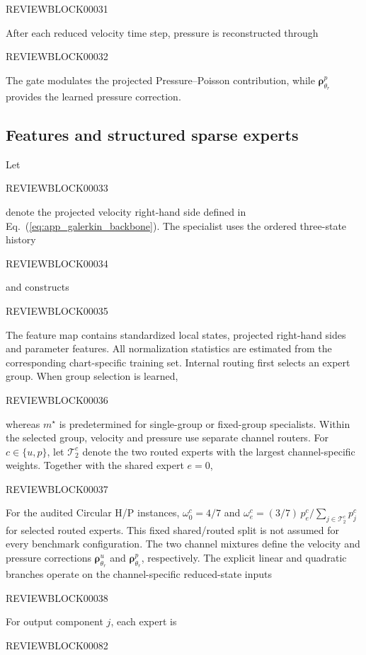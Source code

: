 \documentclass{article}
\def\plaineqref#1{\ref{#1}}
\begin{document}
REVIEWBLOCK00031


After each reduced velocity time step, pressure is reconstructed through


REVIEWBLOCK00032


The gate modulates the projected Pressure--Poisson contribution, while
$\bm\rho^p_{\theta_r}$ provides the learned pressure correction.


\subsection{Features and structured sparse experts}

Let


REVIEWBLOCK00033


denote the projected velocity right-hand side defined in Eq.~(\plaineqref{eq:app_galerkin_backbone}). The specialist uses the ordered three-state history


REVIEWBLOCK00034


and constructs


REVIEWBLOCK00035


The feature map contains standardized local states, projected
right-hand sides and parameter features. All normalization statistics are estimated from the corresponding chart-specific training set. Internal routing first selects an expert group. When group selection is learned,


REVIEWBLOCK00036


whereas $m^\star$ is predetermined for single-group or fixed-group
specialists. Within the selected group, velocity and pressure use separate channel routers. For $c\in\{u,p\}$, let $\mathcal T_2^c$ denote the two routed experts with the largest channel-specific weights. Together with the shared expert $e=0$,


REVIEWBLOCK00037


For the audited Circular H/P instances, $\omega_0^c=4/7$ and
$\omega_e^c=(3/7)\,p_e^c/\sum_{j\in\mathcal T_2^c}p_j^c$ for selected
routed experts. This fixed shared/routed split is not assumed for every
benchmark configuration.
The two channel mixtures define the velocity and pressure corrections
$\bm\rho_{\theta_r}^u$ and $\bm\rho_{\theta_r}^p$, respectively. The explicit linear and quadratic branches operate on the channel-specific reduced-state inputs


REVIEWBLOCK00038


For output component $j$, each expert is


REVIEWBLOCK00082
\end{document}
